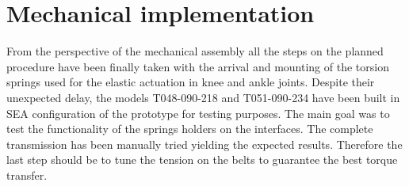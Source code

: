 \section{Mechanical implementation} %
\label{sec:mechanical_implementation}
From the perspective of the mechanical assembly all the steps on the planned procedure have been finally taken with the arrival and mounting of the torsion springs used for the elastic actuation in knee and ankle joints. 
Despite their unexpected delay, the models T048-090-218 and T051-090-234 have been built in SEA configuration of the prototype for testing purposes.
The main goal was to test the functionality of the springs holders on the interfaces. 
The complete transmission has been manually tried yielding the expected results. 
Therefore the last step should be to tune the tension on the belts to guarantee the best torque transfer.

